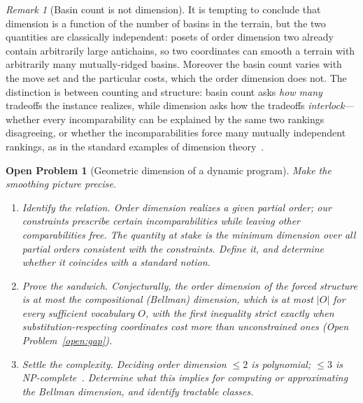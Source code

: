\documentclass[sigconf,nonacm]{acmart}
\theoremstyle{definition}
\theoremstyle{plain}
\newtheorem{openproblem}[definition]{Open Problem}
\theoremstyle{remark}
\newtheorem{remark}[definition]{Remark}
\begin{document}
\begin{remark}[Basin count is not dimension]
It is tempting to conclude that dimension is a function of the
number of basins in the terrain, but the two quantities are
classically independent: posets of order dimension two already
contain arbitrarily large antichains, so two coordinates can smooth
a terrain with arbitrarily many mutually-ridged basins.  Moreover
the basin count varies with the move set and the particular costs,
which the order dimension does not.  The distinction is between
counting and structure: basin count asks \emph{how many} tradeoffs
the instance realizes, while dimension asks how the tradeoffs
\emph{interlock}---whether every incomparability can be explained by
the same two rankings disagreeing, or whether the incomparabilities
force many mutually independent rankings, as in the standard
examples of dimension theory~\cite{trotter1992}.
\end{remark}

\begin{openproblem}[Geometric dimension of a dynamic program]
\label{open:geometric-dim}
Make the smoothing picture precise.
\begin{enumerate}
\item \emph{Identify the relation.}  Order dimension realizes a
  given partial order; our constraints prescribe certain
  incomparabilities while leaving other comparabilities free.  The
  quantity at stake is the minimum dimension over all partial orders
  consistent with the constraints.  Define it, and determine whether
  it coincides with a standard notion.
\item \emph{Prove the sandwich.}  Conjecturally, the order dimension
  of the forced structure is at most the compositional (Bellman)
  dimension, which is at most $|O|$ for every sufficient vocabulary
  $O$, with the first inequality strict exactly when
  substitution-respecting coordinates cost more than unconstrained
  ones (Open Problem~\ref{open:gap}).
\item \emph{Settle the complexity.}  Deciding order dimension
  $\le 2$ is polynomial; $\le 3$ is
  NP-complete~\cite{yannakakis1982}.  Determine what this implies
  for computing or approximating the Bellman dimension, and identify
  tractable classes.
\end{enumerate}
\end{openproblem}
\end{document}

